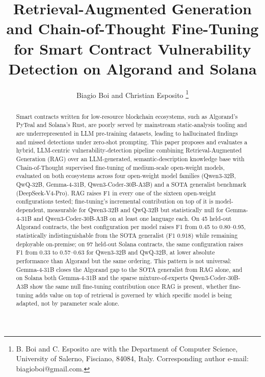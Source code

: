 \documentclass[lettersize,journal]{IEEEtran}
\begin{document}
\title{Retrieval-Augmented Generation and Chain-of-Thought Fine-Tuning for Smart Contract
Vulnerability Detection on Algorand and Solana}

\author{Biagio Boi and Christian Esposito%
\thanks{B. Boi and C. Esposito are with the Department of Computer Science, University of Salerno,
Fisciano, 84084, Italy. Corresponding author e-mail: biagioboi@gmail.com.}}


\maketitle

\begin{abstract}
Smart contracts written for low-resource blockchain ecosystems, such as Algorand's PyTeal and
Solana's Rust, are poorly served by mainstream static-analysis tooling and are underrepresented in
LLM pre-training datasets, leading to hallucinated findings and missed detections under zero-shot
prompting. This paper proposes and evaluates a hybrid, LLM-centric vulnerability-detection pipeline
combining Retrieval-Augmented Generation (RAG) over an LLM-generated, semantic-description knowledge
base with Chain-of-Thought supervised fine-tuning of medium-scale open-weight models, evaluated on
both ecosystems across four open-weight model families (Qwen3-32B, QwQ-32B, Gemma-4-31B,
Qwen3-Coder-30B-A3B) and a SOTA generalist benchmark (DeepSeek-V4-Pro). RAG raises F1 in every one
of the sixteen open-weight configurations tested; fine-tuning's incremental contribution on top of
it is model-dependent, measurable for Qwen3-32B and QwQ-32B but statistically null for Gemma-4-31B
and Qwen3-Coder-30B-A3B on at least one language each. On 45 held-out Algorand contracts, the best
configuration per model raises F1 from 0.45 to 0.80--0.95, statistically indistinguishable from the
SOTA generalist (F1 0.918) while remaining deployable on-premise; on 97 held-out Solana contracts,
the same configuration raises F1 from 0.33 to 0.57--0.63 for Qwen3-32B and QwQ-32B, at lower absolute
performance than Algorand but the same ordering. This pattern is not universal: Gemma-4-31B closes
the Algorand gap to the SOTA generalist from RAG alone, and on Solana both Gemma-4-31B and the
sparse mixture-of-experts Qwen3-Coder-30B-A3B show the same null fine-tuning contribution once RAG
is present, whether fine-tuning adds value on top of retrieval is governed by which specific model
is being adapted, not by parameter scale alone.
\end{abstract}
\end{document}
